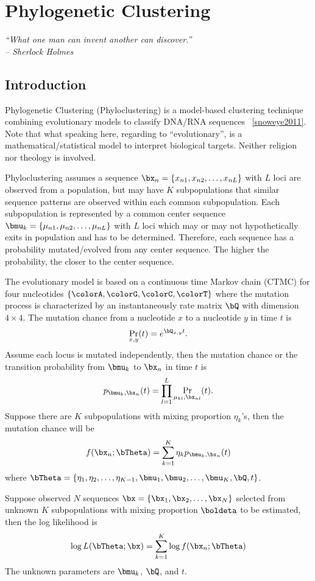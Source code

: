 
\chapter{Phylogenetic Clustering}
\label{chp:phyclust}


{\it
``What one man can invent another can discover.''\\
\--- Sherlock Holmes
}


\section{Introduction}

Phylogenetic Clustering (Phyloclustering)
is a model-based clustering
technique combining evolutionary models to classify DNA/RNA sequences
~\ref{snoweye2011}.
Note that what speaking here, regarding to ``evolutionary'',
is a mathematical/statistical model to interpret biological targets.
Neither religion nor theology is involved. 

Phyloclustering assumes a sequence
$\bx_n = \{x_{n1}, x_{n2},\ldots, x_{nL}\}$
with $L$ loci
are observed from a population, but
may have $K$ subpopulations that similar sequence patterns are observed
within each common subpopulation.
Each subpopulation is represented by a common center sequence
$\bmu_k = \{\mu_{n1}, \mu_{n2},\ldots, \mu_{nL}\}$
with $L$ loci which may
or may not hypothetically exits in population and has to be determined.
Therefore, each sequence has a probability mutated/evolved from any
center sequence. The higher the probability, the closer to the center
sequence.

The evolutionary model is based on a continuous time Markov chain (CTMC)
for four nucleotides $\{\colorA, \colorG, \colorC, \colorT\}$
where the mutation process is characterized by
an instantaneously rate matrix $\bQ$ with dimension $4\times 4$.
The mutation chance from a nucleotide $x$ to a nucleotide $y$ in time $t$ is
$$
\Pr_{x, y}(t) = e^{\bQ_{x, y}t}.
$$
Assume each locus is mutated independently, then the mutation chance or
the transition probability from $\bmu_k$ to $\bx_n$ in time $t$ is
$$
p_{\bmu_k, \bx_n}(t) = \prod_{l = 1}^L \Pr_{\mu_{kl}, \bx_{nl}}(t).
$$
Suppose there are $K$ subpopulations with mixing proportion $\eta_k$'s, then
the mutation chance will be
$$
f(\bx_n; \bTheta) = \sum_{k = 1}^K \eta_k p_{\bmu_k, \bx_n}(t)
$$
where $\bTheta = \{\eta_1, \eta_2, \ldots, \eta_{K-1},
                   \bmu_1, \bmu_2, \ldots, \bmu_{K}, \bQ, t\}$.


Suppose observed $N$ sequences $\bx = \{\bx_1, \bx_2, \ldots, \bx_N\}$
selected from unknown $K$ subpopulations
with mixing proportion $\boldeta$ to be estimated,
then the log likelihood is
$$
\log L(\bTheta; \bx) = \sum_{k = 1}^K \log f(\bx_n; \bTheta)
$$
The unknown parameters are $\bmu_k$, $\bQ$, and $t$.


